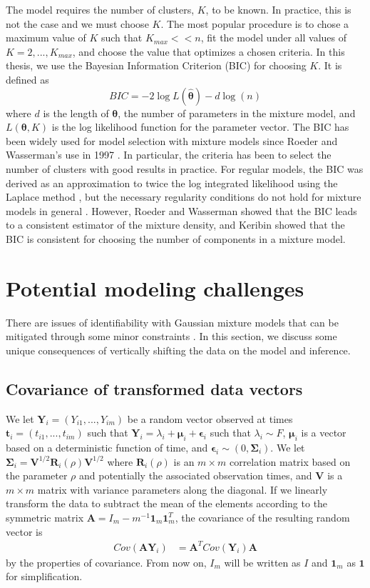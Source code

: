 \documentclass[12pt]{article}
\newcommand{\B}[0]{\mathbf}
\newcommand{\bs}[0]{\boldsymbol}
\begin{document}
The model requires the number of clusters, $K$, to be known. In practice, this is not the case and we must choose $K$. The most popular procedure is to chose a maximum value of $K$ such that $K_{max}<<n$, fit the model under all values of $K=2,...,K_{max}$, and choose the value that optimizes a chosen criteria. In this thesis, we use the Bayesian Information Criterion (BIC) \cite{schwarz1978} for choosing $K$. It is defined as
$$BIC = -2\log L(\hat{\bs\theta})- d\log(n)$$
where $d$ is the length of $\bs\theta$, the number of parameters in the mixture model, and $L(\bs\theta,K)$ is the log likelihood function for the parameter vector. The BIC has been widely used for model selection with mixture models since Roeder and Wasserman's use in 1997 \cite{roeder1997}. In particular, the criteria has been to select the number of clusters \cite{dasgupta1999,fraley1999} with good results in practice. For regular models, the BIC was derived as an approximation to twice the log integrated likelihood using the Laplace method \cite{tierney1986}, but the necessary regularity conditions do not hold for mixture models in general \cite{aitkin1985}. However, Roeder and Wasserman \cite{roeder1997} showed that the BIC leads to a consistent estimator of the mixture density, and Keribin \cite{keribin2000} showed that the BIC is consistent for choosing the number of components in a mixture model.

\section{Potential modeling challenges}
There are issues of identifiability with Gaussian mixture models that can be mitigated through some minor constraints \cite{mclachlan2000}. In this section, we discuss some unique consequences of vertically shifting the data on the model and inference.

\subsection{Covariance of transformed data vectors}
We let $\B Y_{i}=(Y_{i1},...,Y_{im})$ be a random vector observed at times $\B t_{i}=(t_{i1},...,t_{im})$ such that
$\B Y_{i} = \lambda_{i} + \bs\mu_{i} + \bs\epsilon_{i}$
such that $\lambda_{i}\sim F$, $\bs\mu_{i}$ is a vector based on a deterministic function of time, and $\bs\epsilon_{i}\sim(0,\bs\Sigma_{i})$. We let $\B\Sigma_{i} =\B V^{1/2}\B R_{i}(\rho)\B V^{1/2}$ where $\B R_{i}(\rho)$ is an $m\times m$ correlation matrix based on the parameter $\rho$ and potentially the associated observation times, and $\B V$ is a $m\times m$ matrix with variance parameters along the diagonal. If we linearly transform the data to subtract the mean of the elements according to the symmetric matrix $\B A = I_{m}-m^{-1}\B 1_{m}\B 1_{m}^{T}$, the covariance of the resulting random vector is
\begin{align*}
Cov(\B A\B Y_{i}) &= \B A^{T}Cov(\B Y_{i})\B A
\end{align*}
by the properties of covariance. From now on, $I_{m}$ will be written as $I$ and $\B 1_{m}$ as $\B 1$ for simplification.
\end{document}
